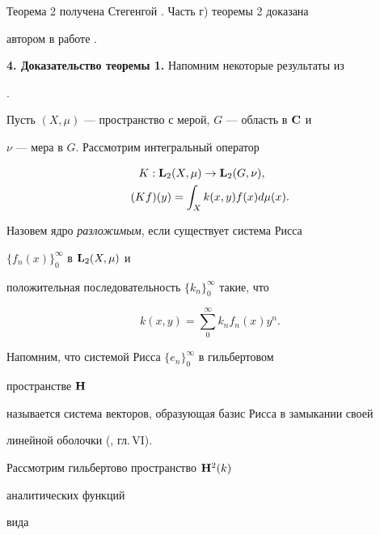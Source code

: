 Теорема 2 получена Стегенгой \cite{4}. Часть г) теоремы 2 доказана


автором в работе \cite{1}.


\medskip





{\bf 4. Доказательство теоремы 1.} Напомним некоторые результаты из


\cite{2}.





Пусть $(X,\mu)$ --- пространство с мерой, $G$ --- область в $\bold C$ и


$\nu$ --- мера в $G$. Рассмотрим интегральный оператор


\begin{equation}


\begin{split}


K:\bold L_2&(X,\mu)\to\bold L_2(G,\nu),\\


(Kf)(y)&=\int_X k(x,y)f(x)d\mu(x).


\end{split}


\end{equation}


Назовем ядро {\em разложимым}, если существует система Рисса


$\{f_n(x)\}^\infty_0$ в $\bold L_2(X,\mu)$ и


положительная последовательность $\{k_n\}^\infty_0$ такие, что


\begin{equation}


k(x,y)=\sum^\infty_0 k_n f_n(x)y^n.


\end{equation}


Напомним, что системой Рисса $\{e_n\}^\infty_0$ в гильбертовом


пространстве $\bold H$


называется система векторов, образующая базис Рисса в замыкании своей


линейной оболочки (\cite{3}, гл.\,VI).





Рассмотрим гильбертово пространство $\bold H^2(k)$


аналитических функций


вида


$$


